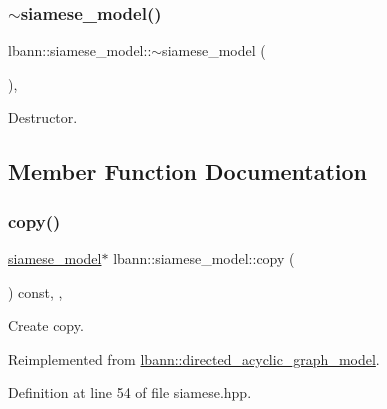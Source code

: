 \subsubsection{\texorpdfstring{$\sim$siamese\+\_\+model()}{~siamese\_model()}}
{\footnotesize\ttfamily lbann\+::siamese\+\_\+model\+::$\sim$siamese\+\_\+model (\begin{DoxyParamCaption}{ }\end{DoxyParamCaption})\hspace{0.3cm}{\ttfamily [override]}, {\ttfamily [default]}}

Destructor. 

\subsection{Member Function Documentation}
\mbox{\label{classlbann_1_1siamese__model_a26bbedec5306e47e214124cca2cb381b}} 
\subsubsection{\texorpdfstring{copy()}{copy()}}
{\footnotesize\ttfamily \hyperlink{classlbann_1_1siamese__model}{siamese\+\_\+model}$\ast$ lbann\+::siamese\+\_\+model\+::copy (\begin{DoxyParamCaption}{ }\end{DoxyParamCaption}) const\hspace{0.3cm}{\ttfamily [inline]}, {\ttfamily [override]}, {\ttfamily [virtual]}}

Create copy. 

Reimplemented from \hyperlink{classlbann_1_1directed__acyclic__graph__model_a6a21050a732686e9e6c9f384ff9fda51}{lbann\+::directed\+\_\+acyclic\+\_\+graph\+\_\+model}.



Definition at line 54 of file siamese.\+hpp.


